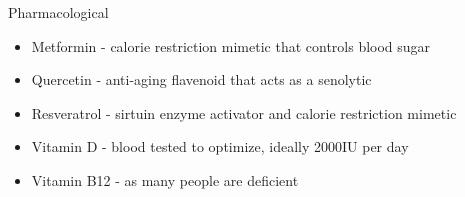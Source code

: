 \begin{frame}[c]{Pharmacological}
    \begin{itemize}[<+(1)->]
        \item Metformin - calorie restriction mimetic that controls blood sugar
        \item Quercetin - anti-aging flavenoid that acts as a senolytic
        \item Resveratrol - sirtuin enzyme activator and calorie restriction mimetic
        \item Vitamin D - blood tested to optimize, ideally 2000IU per day
        \item Vitamin B12 - as many people are deficient
    \end{itemize}
\end{frame}


